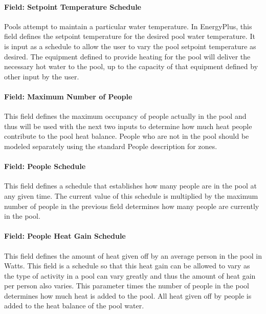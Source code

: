 \paragraph{Field: Setpoint Temperature Schedule}\label{field-setpoint-temperature-schedule}

Pools attempt to maintain a particular water temperature. In EnergyPlus, this field defines the setpoint temperature for the desired pool water temperature. It is input as a schedule to allow the user to vary the pool setpoint temperature as desired. The equipment defined to provide heating for the pool will deliver the necessary hot water to the pool, up to the capacity of that equipment defined by other input by the user.

\paragraph{Field: Maximum Number of People}\label{field-maximum-number-of-people}

This field defines the maximum occupancy of people actually in the pool and thus will be used with the next two inputs to determine how much heat people contribute to the pool heat balance. People who are not in the pool should be modeled separately using the standard People description for zones.

\paragraph{Field: People Schedule}\label{field-people-schedule}

This field defines a schedule that establishes how many people are in the pool at any given time. The current value of this schedule is multiplied by the maximum number of people in the previous field determines how many people are currently in the pool.

\paragraph{Field: People Heat Gain Schedule}\label{field-people-heat-gain-schedule}

This field defines the amount of heat given off by an average person in the pool in Watts. This field is a schedule so that this heat gain can be allowed to vary as the type of activity in a pool can vary greatly and thus the amount of heat gain per person also varies. This parameter times the number of people in the pool determines how much heat is added to the pool. All heat given off by people is added to the heat balance of the pool water.

